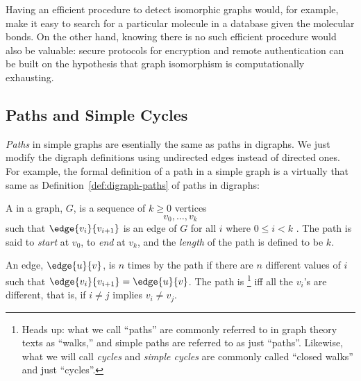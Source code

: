 Having an efficient procedure to detect isomorphic graphs would, for
example, make it easy to search for a particular molecule in a database
given the molecular bonds.  On the other hand, knowing there is no such
efficient procedure would also be valuable: secure protocols for
encryption and remote authentication can be built on the hypothesis that
graph isomorphism is computationally exhausting.

\begin{problems}
\classproblems
{}

\homeworkproblems
{}

\examproblems
{}
\end{problems}



\subsection{Paths and Simple Cycles}

\emph{Paths} in simple graphs are esentially the same as paths in digraphs.
We just modify the digraph definitions using undirected edges instead of directed
ones.  For example, the formal definition of a path in a simple graph is a virtually
that same as Definition~\ref{def:digraph-paths} of paths in digraphs:

\begin{definition}\label{def:undirected-path}
A  in a graph, $G$, is a sequence of $k \geq 0$ vertices
\[
v_0,\dots,v_k
\]
such that $\edge{v_i}{v_{i+1}}$ is an edge of $G$ for all $i$ where $0
\leq i < k$ .  The path is said to \emph{start} at
$v_0$, to \emph{end} at $v_k$, and the \emph{length} of the path is defined to be $k$.

An edge, $\edge{u}{v}$, is  $n$ times by the path if there
are $n$ different values of $i$ such that $\edge{v_i}{v_{i+1}} =
\edge{u}{v}$.  The path is \footnote{Heads up: what we call
  ``paths'' are commonly referred to in graph theory texts as ``walks,'' and simple
  paths are referred to as just ``paths''.  Likewise, what we will call \emph{cycles}
  and \emph{simple cycles} are commonly called ``closed walks'' and just ``cycles''.}
  iff all the $v_i$'s are different, that is, if $i\neq j$ implies $v_i \neq v_j$.
\end{definition}

